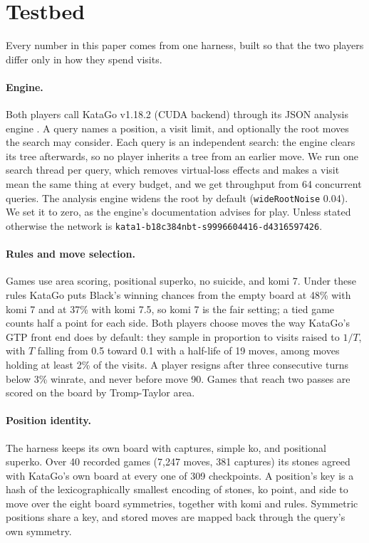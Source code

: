 \section{Testbed}
\label{sec:setup}

Every number in this paper comes from one harness, built so that the two players differ only in how they spend visits.

\paragraph{Engine.}
Both players call KataGo v1.18.2 (CUDA backend) through its JSON analysis engine \citep{katago_analysis}. A query names a position, a visit limit, and optionally the root moves the search may consider. Each query is an independent search: the engine clears its tree afterwards, so no player inherits a tree from an earlier move. We run one search thread per query, which removes virtual-loss effects and makes a visit mean the same thing at every budget, and we get throughput from 64 concurrent queries. The analysis engine widens the root by default (\texttt{wideRootNoise} 0.04). We set it to zero, as the engine's documentation advises for play. Unless stated otherwise the network is \texttt{kata1-b18c384nbt-s9996604416-d4316597426}.

\paragraph{Rules and move selection.}
Games use area scoring, positional superko, no suicide, and komi 7. Under these rules KataGo puts Black's winning chances from the empty board at 48\% with komi 7 and at 37\% with komi 7.5, so komi 7 is the fair setting; a tied game counts half a point for each side. Both players choose moves the way KataGo's GTP front end does by default: they sample in proportion to visits raised to $1/T$, with $T$ falling from 0.5 toward 0.1 with a half-life of 19 moves, among moves holding at least 2\% of the visits. A player resigns after three consecutive turns below 3\% winrate, and never before move 90. Games that reach two passes are scored on the board by Tromp-Taylor area.

\paragraph{Position identity.}
The harness keeps its own board with captures, simple ko, and positional superko. Over 40 recorded games (7{,}247 moves, 381 captures) its stones agreed with KataGo's own board at every one of 309 checkpoints. A position's key is a hash of the lexicographically smallest encoding of stones, ko point, and side to move over the eight board symmetries, together with komi and rules. Symmetric positions share a key, and stored moves are mapped back through the query's own symmetry.

